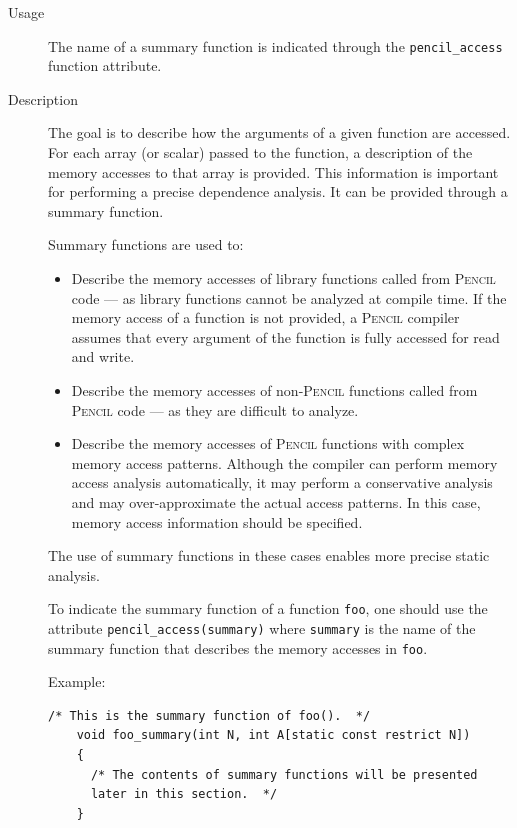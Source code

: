 \documentclass{carp}
\newcommand\pencil{\textsc{Pencil}\xspace}
\begin{document}
\begin{description}
  \item [Usage] The name of a summary function is indicated through
  the \lstinline!pencil_access! function attribute.

  \item [Description] The goal is to describe how the arguments of a given
  function are accessed.
  For each array (or scalar) passed to the function,
  a description of the memory accesses to that array is provided.
  This information is important for performing a precise dependence
  analysis.
  It can be provided through a summary function.
  
  Summary functions are used to:
    \begin{itemize}
     \item Describe the memory accesses of library functions
     called from \pencil code --- as library functions cannot be analyzed at
     compile time.
     If the memory access of a function is not provided, a \pencil
     compiler assumes that every argument of the function is fully accessed
     for read and write.
     
     \item Describe the memory accesses of non-\pencil
     functions called from \pencil code --- as they are difficult
     to analyze.

     \item Describe the memory accesses of \pencil functions with complex
     memory access patterns.
     Although the compiler can perform memory access analysis automatically,
     it may perform a conservative analysis and may over-approximate the
     actual access patterns.  In this case, memory access information should
     be specified.
    \end{itemize}

  The use of summary functions in these cases enables more
  precise static analysis.

  To indicate the summary function of a function \lstinline!foo!,
  one should use the attribute \lstinline!pencil_access(summary)! where
  \lstinline!summary! is the name of the summary function  that describes
  the memory accesses in \lstinline!foo!.
  
  Example:
  \begin{lstlisting}[language=pencil]
    /* This is the summary function of foo().  */
    void foo_summary(int N, int A[static const restrict N])
    {
      /* The contents of summary functions will be presented
      later in this section.  */
    }


\end{lstlisting}
\end{description}
\end{document}
